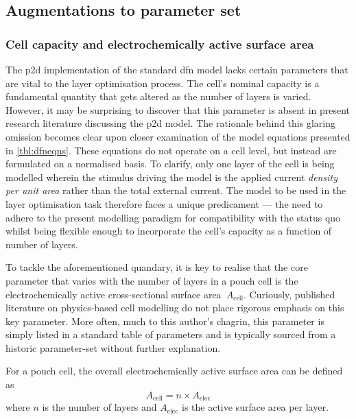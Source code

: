 
\subsection{Augmentations to parameter set}\label{sec:p2daugmentations}

\subsubsection*{Cell capacity and electrochemically active surface area}

The  \gls{p2d} implementation  of  the standard  \gls{dfn}  model lacks  certain
parameters that are vital to the  layer optimisation process. The cell's nominal
capacity is a fundamental quantity that gets  altered as the number of layers is
varied. However, it may be surprising  to discover that this parameter is absent
in present  research literature  discussing the  \gls{p2d} model.  The rationale
behind this glaring omission becomes clear  upon closer examination of the model
equations presented in  \cref{tbl:dfneqns}. These equations do not  operate on a
cell level, but  instead are formulated on a normalised  basis. To clarify, only
one layer of the  cell is being modelled wherein the  stimulus driving the model
is  the applied  current  \emph{density per  unit area}  rather  than the  total
external current. The model to be  used in the layer optimisation task therefore
faces  a unique  predicament ---  the need  to adhere  to the  present modelling
paradigm for compatibility  with the status quo whilst being  flexible enough to
incorporate the cell's capacity as a function of number of layers.

To  tackle  the  aforementioned  quandary,  it   is  key  to  realise  that  the
core  parameter  that  varies  with  the  number  of  layers  in  a  pouch  cell
is  the electrochemically  active cross-sectional  surface area~$A_\text{cell}$.
Curiously, published  literature on  physics-based cell  modelling do  not place
rigorous  emphasis on  this key  parameter. More  often, much  to this  author's
chagrin, this parameter  is simply listed in a standard  table of parameters and
is typically sourced from a historic parameter-set without further explanation.

For  a pouch  cell, the  overall electrochemically  active surface  area can  be
defined as
\begin{equation}\label{eq:overallarea}
    A_\text{cell} = n \times A_\text{elec}
\end{equation}
where $n$ is the number of layers and $A_\text{elec}$ is the active surface area
per layer.

